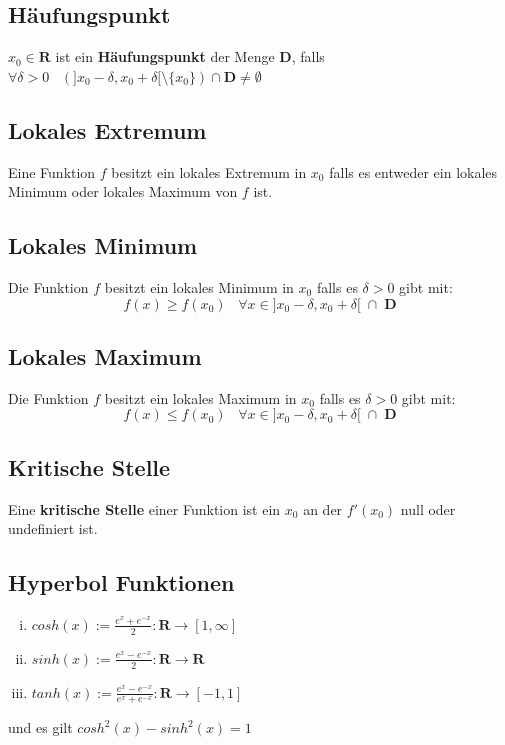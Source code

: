 \documentclass[8pt]{article}
\begin{document}
\begin{multicols*}{3}
\subsection{Häufungspunkt}

$x_0 \in \mathbf{R}$ ist ein \textbf{Häufungspunkt} der Menge $\mathbf{D}$,
falls $\forall \delta > 0 \;\;\; (]x_0 - \delta, x_0 + \delta[ \setminus \{x_0\}) \cap \mathbf{D} \neq \emptyset$

\subsection{Lokales Extremum}

Eine Funktion $f$ besitzt ein lokales Extremum in $x_0$ falls es entweder ein lokales Minimum oder lokales Maximum von $f$ ist.

\subsection{Lokales Minimum}

Die Funktion $f$ besitzt ein lokales Minimum in $x_0$ falls es $\delta > 0$ gibt mit:
$$f(x) \geq f(x_0) \;\;\; \forall x \in ]x_0 - \delta, x_0 + \delta[\; \cap \; \mathbf{D}$$

\subsection{Lokales Maximum}

Die Funktion $f$ besitzt ein lokales Maximum in $x_0$ falls es $\delta > 0$ gibt mit:
$$f(x) \leq f(x_0) \;\;\; \forall x \in ]x_0 - \delta, x_0 + \delta[\; \cap \; \mathbf{D}$$

\subsection{Kritische Stelle}

Eine \textbf{kritische Stelle} einer Funktion ist ein $x_0$ an der $f'(x_0)$ null
oder undefiniert ist.

\subsection{Hyperbol Funktionen}

\begin{enumerate}[(i)]
  \item $cosh(x) := \frac{e^x + e^{-x}}{2}: \mathbf{R} \rightarrow [1, \infty]$
  \item $sinh(x) := \frac{e^x - e^{-x}}{2}: \mathbf{R} \rightarrow \mathbf{R}$
  \item $tanh(x) := \frac{e^x - e^{-x}}{e^x + e^{-x}}: \mathbf{R} \rightarrow [-1, 1]$
\end{enumerate}
und es gilt $cosh^2(x) - sinh^2(x) = 1$




\end{multicols*}
\end{document}
